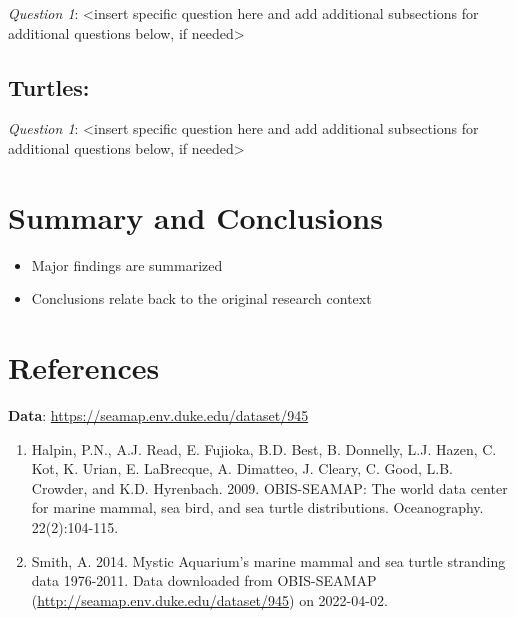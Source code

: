 \documentclass[
  12pt,
]{article}
\providecommand{\tightlist}{%
  \setlength{\itemsep}{0pt}\setlength{\parskip}{0pt}}
\begin{document}
\emph{Question 1}: \textless insert specific question here and add
additional subsections for additional questions below, if
needed\textgreater{}

\hypertarget{turtles}{%
\subsection{\texorpdfstring{\textbf{Turtles}:}{Turtles:}}\label{turtles}}

\emph{Question 1}: \textless insert specific question here and add
additional subsections for additional questions below, if
needed\textgreater{}

\newpage

\hypertarget{summary-and-conclusions}{%
\section{Summary and Conclusions}\label{summary-and-conclusions}}

\begin{itemize}
\tightlist
\item
  Major findings are summarized
\item
  Conclusions relate back to the original research context
\end{itemize}

\newpage

\hypertarget{references}{%
\section{References}\label{references}}

\textbf{Data}: \url{https://seamap.env.duke.edu/dataset/945}

\begin{enumerate}
\def\labelenumi{\arabic{enumi}.}
\item
  Halpin, P.N., A.J. Read, E. Fujioka, B.D. Best, B. Donnelly, L.J.
  Hazen, C. Kot, K. Urian, E. LaBrecque, A. Dimatteo, J. Cleary, C.
  Good, L.B. Crowder, and K.D. Hyrenbach. 2009. OBIS-SEAMAP: The world
  data center for marine mammal, sea bird, and sea turtle distributions.
  Oceanography. 22(2):104-115.
\item
  Smith, A. 2014. Mystic Aquarium's marine mammal and sea turtle
  stranding data 1976-2011. Data downloaded from OBIS-SEAMAP
  (\url{http://seamap.env.duke.edu/dataset/945}) on 2022-04-02.
\end{enumerate}
\end{document}
